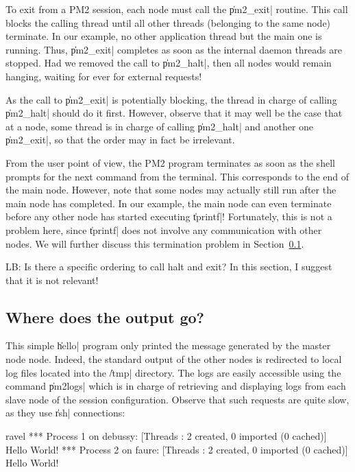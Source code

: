 To exit from a PM2 session, each node must call the \|pm2_exit|
routine.  This call blocks the calling thread until all other threads
(belonging to the same node) terminate. In our example, no other
application thread but the main one is running. Thus, \|pm2_exit|
completes as soon as the internal daemon threads are stopped. Had we
removed the call to \|pm2_halt|, then all nodes would remain hanging,
waiting for ever for external requests!

As the call to \|pm2_exit| is potentially blocking, the thread in
charge of calling \|pm2_halt| should do it first. However, observe
that it may well be the case that at a node, some thread is in charge
of calling \|pm2_halt| and another one \|pm2_exit|, so that the order
may in fact be irrelevant.

From the user point of view, the PM2 program terminates as soon as the
shell prompts for the next command from the terminal. This corresponds
to the end of the main node. However, note that some nodes may
actually still run after the main node has completed.  In our example,
the main node can even terminate before any other node has started
executing \|tprintf|! Fortunately, this is not a problem here, since
\|tprintf| does not involve any communication with other nodes. We will
further discuss this termination problem in Section~\ref{sec:output}.

\begin{note}
  LB: Is there a specific ordering to call halt and exit? In this
  section, I suggest that it is not relevant!
\end{note}


\subsection{Where does the output go?}
\label{sec:output}

This simple \|hello| program only printed the message generated by the
master node node. Indeed, the standard output of the other nodes is
redirected to local log files located into the \|/tmp| directory.  The
logs are easily accessible using the command \|pm2logs| which is in
charge of retrieving and displaying logs from each slave node of the
session configuration. Observe that such requests are quite slow, as
they use \|rsh| connections:
\begin{shell}
ravel%
*** Process 1 on debussy:
[Threads : 2 created, 0 imported (0 cached)]
Hello World!
*** Process 2 on faure:
[Threads : 2 created, 0 imported (0 cached)]
Hello World!
\end{shell}

